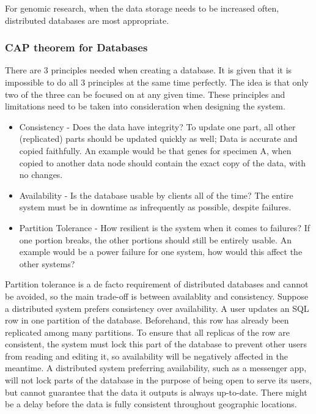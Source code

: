 \documentclass[acmsmall]{acmart}
\begin{document}
For genomic research, when the data storage needs to be increased often, distributed databases are most appropriate.

\subsubsection{CAP theorem for Databases} \label{cap}
There are 3 principles needed when creating a database\cite{Silberschatz2010}. It is given that it is impossible to do all 3 principles at the same time perfectly\cite{gilbert2012perspectives}. The idea is that only two of the three can be focused on at any given time. These principles and limitations need to be taken into consideration when designing the system. 

\begin{itemize}
    \item Consistency - Does the data have integrity? To update one part, all other (replicated) parts should be updated quickly as well; Data is accurate and copied faithfully. An example would be that genes for specimen A, when copied to another data node should contain the exact copy of the data, with no changes.
    \item Availability - Is the database usable by clients all of the time? The entire system must be in downtime as infrequently as possible, despite failures.
    \item Partition Tolerance - How resilient is the system when it comes to failures? If one portion breaks, the other portions should still be entirely usable. An example would be a power failure for one system, how would this affect the other systems?
\end{itemize}

Partition tolerance is a de facto requirement of distributed databases and cannot be avoided, so the main trade-off is between availablity and consistency. \cite{Silberschatz2010} Suppose a distributed system prefers consistency over availability. A user updates an SQL row in one partition of the database. Beforehand, this row has already been replicated among many partitions. To ensure that all replicas of the row are consistent, the system must lock this part of the database to prevent other users from reading and editing it, so availability will be negatively affected in the meantime. A distributed system preferring availability, such as a messenger app, will not lock parts of the database in the purpose of being open to serve its users, but cannot guarantee that the data it outputs is always up-to-date. There might be a delay before the data is fully consistent throughout geographic locations.
\end{document}
